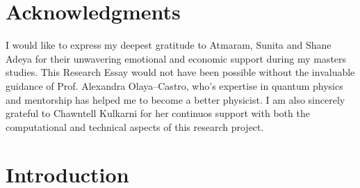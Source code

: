 \documentclass[11pt]{article}
\begin{document}
\newpage
\section*{Acknowledgments}
I would like to express my deepest gratitude to Atmaram, Sunita and Shane Adeya for their unwavering emotional and economic support during my masters studies. This Research Essay would not have been possible without the invaluable guidance of Prof. Alexandra Olaya--Castro, who's expertise in quantum physics and mentorship has helped me to become a better physicist. I am also sincerely grateful to Chawntell Kulkarni for her continuos support with both the computational and technical aspects of this research project.  
\newpage
\tableofcontents
\newpage
{}
\section{Introduction}
\end{document}

